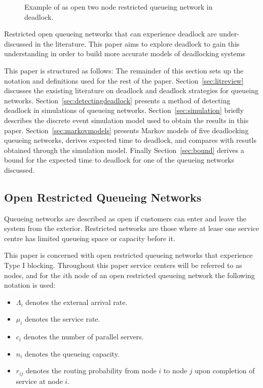 \documentclass{article}
\begin{document}
\begin{figure}[!htbp]
  \begin{center}
  
  \end{center}
  \caption{Example of as open two node restricted queueing network in deadlock.}
  \label{fig:1st_example}
\end{figure}

Restricted open queueing networks that can experience deadlock are under-discussed in the literature.
This paper aims to explore deadlock to gain this understanding in order to build more accurate models of deadlocking systems

This paper is structured as follows: The remainder of this section sets up the notation and definitions used for the rest of the paper. Section~\ref{sec:litreview} discusses the exsisting literature on deadlock and deadlock strategies for queueing networks. Section~\ref{sec:detectingdeadlock} presents a method of detecting deadlock in simulations of queueing networks. Section~\ref{sec:simulation} briefly describes the discrete event simulation model used to obtain the results in this paper. Section~\ref{sec:markovmodels} presents Markov models of five deadlocking queueing networks, derives expected time to deadlock, and compares with resutls obtained through the simulation model. Finally Section~\ref{sec:bound} derives a bound for the expected time to deadlock for one of the queueing networks discussed.

\subsection{Open Restricted Queueing Networks}

Queueing networks are described as open if customers can enter and leave the system from the exterior.
Restricted networks are those where at lease one service centre has limited queueing space or capacity before it.

This paper is concerned with open restricted queueing networks that experience Type I blocking.
Throughout this paper service centers will be referred to as nodes, and for the $i$th node of an open restricted queueing network the following notation is used:

\begin{itemize}
  \item $\Lambda_i$ denotes the external arrival rate.
  \item $\mu_i$ denotes the service rate.
  \item $c_i$ denotes the number of parallel servers.
  \item $n_i$ denotes the queueing capacity.
  \item $r_{ij}$ denotes the routing probability from node $i$ to node $j$ upon completion of service at node $i$.
\end{itemize}
\end{document}
